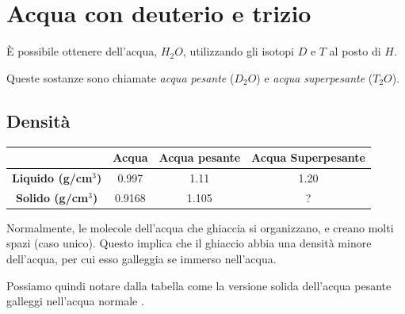 \documentclass[a4paper]{article}
\begin{document}
\section{Acqua con deuterio e trizio}

È possibile ottenere dell'acqua, \(H_2O\), utilizzando gli isotopi \(D\) e \(T\) al posto di \(H\).

Queste sostanze sono chiamate \textit{acqua pesante} (\(D_2O\)) e
\textit{acqua superpesante} (\(T_2O\)).

\subsection{Densità}

\begin{center}
    \bgroup{}
    \def\arraystretch{1.25}
    \begin{tabular}{ |c|c|c|c| }
        \hline
        & \textbf{Acqua} & \textbf{Acqua pesante} & \textbf{Acqua Superpesante} \\
        \hline
        \textbf{Liquido (g/cm\(^3\))} & 0.997 & 1.11 & 1.20 \\
        \hline
        \textbf{Solido (g/cm\(^3\))} & 0.9168 & 1.105 & ? \\
        \hline
    \end{tabular}
    \egroup{}
\end{center}

Normalmente, le molecole dell'acqua che ghiaccia si organizzano, e creano molti spazi (caso unico).
Questo implica che il ghiaccio abbia una densità minore dell'acqua, per cui esso galleggia se immerso nell'acqua.

Possiamo quindi notare dalla tabella come la versione solida dell'acqua pesante galleggi
nell'acqua normale \cite{deuterated-water}.

\nocite{*} %

\printbibliography

\end{document}
